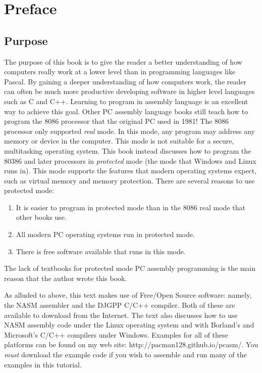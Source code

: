 
\chapter*{Preface}

\section*{Purpose}

The purpose of this book is to give the reader a better understanding
of how computers really work at a lower level than in programming
languages like Pascal. By gaining a deeper understanding of how
computers work, the reader can often be much more productive
developing software in higher level languages such as C and
C++. Learning to program in assembly language is an excellent way to
achieve this goal. Other PC assembly language books still teach how to
program the 8086 processor that the original PC used in 1981!  The
8086 processor only supported \emph{real} mode. In this mode, any
program may address any memory or device in the computer. This mode is
not suitable for a secure, multitasking operating system.  This book
instead discusses how to program the 80386 and later processors in
\emph{protected} mode (the mode that Windows and Linux runs in).
This mode supports the features that modern operating systems expect,
such as virtual memory and memory protection.
There are several reasons to use protected mode:
\begin{enumerate}
\item It is easier to program in protected mode than in the 8086 real mode
      that other books use.
\item All modern PC operating systems run in protected mode.
\item There is free software available that runs in this mode.
\end{enumerate}
The lack of textbooks for protected mode PC assembly programming is the
main reason that the author wrote this book.

As alluded to above, this text makes use of Free/Open Source software: namely,
the NASM assembler and the DJGPP C/C++ compiler. Both of these are available
to download from the Internet. The text also discusses how to use NASM 
assembly code under the Linux operating system and with Borland's and
Microsoft's C/C++ compilers under Windows. Examples for all of these
platforms can be found on my web site: 
{\code http://pacman128.github.io/pcasm/}.
You \emph{must} download the example code if you wish to assemble
and run many of the examples in this tutorial.

